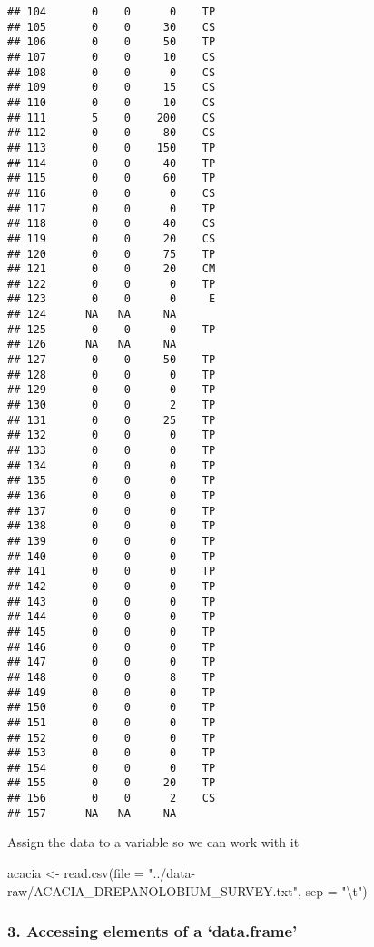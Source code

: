 \documentclass[
]{article}
\newenvironment{Shaded}{\begin{snugshade}}{\end{snugshade}}
\newcommand{\AttributeTok}[1]{\textcolor[rgb]{0.77,0.63,0.00}{#1}}
\newcommand{\FunctionTok}[1]{\textcolor[rgb]{0.00,0.00,0.00}{#1}}
\newcommand{\NormalTok}[1]{#1}
\newcommand{\OtherTok}[1]{\textcolor[rgb]{0.56,0.35,0.01}{#1}}
\newcommand{\SpecialCharTok}[1]{\textcolor[rgb]{0.00,0.00,0.00}{#1}}
\newcommand{\StringTok}[1]{\textcolor[rgb]{0.31,0.60,0.02}{#1}}
\begin{document}
\begin{verbatim}
## 104       0    0      0    TP
## 105       0    0     30    CS
## 106       0    0     50    TP
## 107       0    0     10    CS
## 108       0    0      0    CS
## 109       0    0     15    CS
## 110       0    0     10    CS
## 111       5    0    200    CS
## 112       0    0     80    CS
## 113       0    0    150    TP
## 114       0    0     40    TP
## 115       0    0     60    TP
## 116       0    0      0    CS
## 117       0    0      0    TP
## 118       0    0     40    CS
## 119       0    0     20    CS
## 120       0    0     75    TP
## 121       0    0     20    CM
## 122       0    0      0    TP
## 123       0    0      0     E
## 124      NA   NA     NA      
## 125       0    0      0    TP
## 126      NA   NA     NA      
## 127       0    0     50    TP
## 128       0    0      0    TP
## 129       0    0      0    TP
## 130       0    0      2    TP
## 131       0    0     25    TP
## 132       0    0      0    TP
## 133       0    0      0    TP
## 134       0    0      0    TP
## 135       0    0      0    TP
## 136       0    0      0    TP
## 137       0    0      0    TP
## 138       0    0      0    TP
## 139       0    0      0    TP
## 140       0    0      0    TP
## 141       0    0      0    TP
## 142       0    0      0    TP
## 143       0    0      0    TP
## 144       0    0      0    TP
## 145       0    0      0    TP
## 146       0    0      0    TP
## 147       0    0      0    TP
## 148       0    0      8    TP
## 149       0    0      0    TP
## 150       0    0      0    TP
## 151       0    0      0    TP
## 152       0    0      0    TP
## 153       0    0      0    TP
## 154       0    0      0    TP
## 155       0    0     20    TP
## 156       0    0      2    CS
## 157      NA   NA     NA
\end{verbatim}

Assign the data to a variable so we can work with it

\begin{Shaded}
\begin{Highlighting}[]
\NormalTok{acacia }\OtherTok{\textless{}{-}} \FunctionTok{read.csv}\NormalTok{(}\AttributeTok{file =} \StringTok{"../data{-}raw/ACACIA\_DREPANOLOBIUM\_SURVEY.txt"}\NormalTok{, }\AttributeTok{sep =} \StringTok{"}\SpecialCharTok{\textbackslash{}t}\StringTok{"}\NormalTok{)}
\end{Highlighting}
\end{Shaded}

\hypertarget{accessing-elements-of-a-data.frame}{%
\subsubsection{3. Accessing elements of a
`data.frame'}\label{accessing-elements-of-a-data.frame}}
\end{document}
